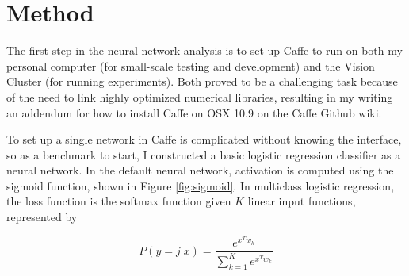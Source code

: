 \documentclass[10pt]{article}
\begin{document}


\section{Method}

The first step in the neural network analysis is to set up Caffe to run on both my personal computer (for small-scale testing and development) and the Vision Cluster (for running experiments). Both proved to be a challenging task because of the need to link highly optimized numerical libraries, resulting in my writing an addendum for how to install Caffe on OSX 10.9 on the Caffe Github wiki.

To set up a single network in Caffe is complicated without knowing the interface, so as a benchmark to start, I constructed a basic logistic regression classifier as a neural network. In the default neural network, activation is computed using the sigmoid function, shown in Figure \ref{fig:sigmoid}. In multiclass logistic regression, the loss function is the softmax function given $K$ linear input functions, represented by 

\begin{equation}
	P(y = j | x) = \frac{e^{x^T w_k}}{\sum_{k = 1}^K e^{x^T w_k}}
\end{equation}
\end{document}

